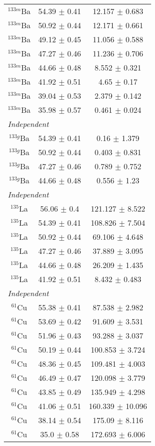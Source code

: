 \begin{ruledtabular}
\begin{tabular}{ccc}
$^{133m}$Ba & 54.39 $\pm$ 0.41 & 12.157 $\pm$ 0.683 \\ 
$^{133m}$Ba & 50.92 $\pm$ 0.44 & 12.171 $\pm$ 0.661 \\ 
$^{133m}$Ba & 49.12 $\pm$ 0.45 & 11.056 $\pm$ 0.588 \\ 
$^{133m}$Ba & 47.27 $\pm$ 0.46 & 11.236 $\pm$ 0.706 \\ 
$^{133m}$Ba & 44.66 $\pm$ 0.48 & 8.552 $\pm$ 0.321 \\ 
$^{133m}$Ba & 41.92 $\pm$ 0.51 & 4.65 $\pm$ 0.17 \\ 
$^{133m}$Ba & 39.04 $\pm$ 0.53 & 2.379 $\pm$ 0.142 \\ 
$^{133m}$Ba & 35.98 $\pm$ 0.57 & 0.461 $\pm$ 0.024 \\ 
\hline
\multicolumn{3}{l}{\textit{Independent}} \\ 
$^{133g}$Ba & 54.39 $\pm$ 0.41 & 0.16 $\pm$ 1.379 \\ 
$^{133g}$Ba & 50.92 $\pm$ 0.44 & 0.403 $\pm$ 0.831 \\ 
$^{133g}$Ba & 47.27 $\pm$ 0.46 & 0.789 $\pm$ 0.752 \\ 
$^{133g}$Ba & 44.66 $\pm$ 0.48 & 0.556 $\pm$ 1.23 \\ 
\hline
\multicolumn{3}{l}{\textit{Independent}} \\ 
$^{135}$La & 56.06 $\pm$ 0.4 & 121.127 $\pm$ 8.522 \\ 
$^{135}$La & 54.39 $\pm$ 0.41 & 108.826 $\pm$ 7.504 \\ 
$^{135}$La & 50.92 $\pm$ 0.44 & 69.106 $\pm$ 4.648 \\ 
$^{135}$La & 47.27 $\pm$ 0.46 & 37.889 $\pm$ 3.095 \\ 
$^{135}$La & 44.66 $\pm$ 0.48 & 26.209 $\pm$ 1.435 \\ 
$^{135}$La & 41.92 $\pm$ 0.51 & 8.432 $\pm$ 0.483 \\ 
\hline
\multicolumn{3}{l}{\textit{Independent}} \\ 
$^{61}$Cu & 55.38 $\pm$ 0.41 & 87.538 $\pm$ 2.982 \\ 
$^{61}$Cu & 53.69 $\pm$ 0.42 & 91.609 $\pm$ 3.531 \\ 
$^{61}$Cu & 51.96 $\pm$ 0.43 & 93.288 $\pm$ 3.037 \\ 
$^{61}$Cu & 50.19 $\pm$ 0.44 & 100.853 $\pm$ 3.724 \\ 
$^{61}$Cu & 48.36 $\pm$ 0.45 & 109.481 $\pm$ 4.003 \\ 
$^{61}$Cu & 46.49 $\pm$ 0.47 & 120.098 $\pm$ 3.779 \\ 
$^{61}$Cu & 43.85 $\pm$ 0.49 & 135.949 $\pm$ 4.298 \\ 
$^{61}$Cu & 41.06 $\pm$ 0.51 & 160.339 $\pm$ 10.096 \\ 
$^{61}$Cu & 38.14 $\pm$ 0.54 & 175.09 $\pm$ 8.116 \\ 
$^{61}$Cu & 35.0 $\pm$ 0.58 & 172.693 $\pm$ 6.006 \\ \end{tabular}
\label{table:all_xs}
\end{ruledtabular}
\ \ 

